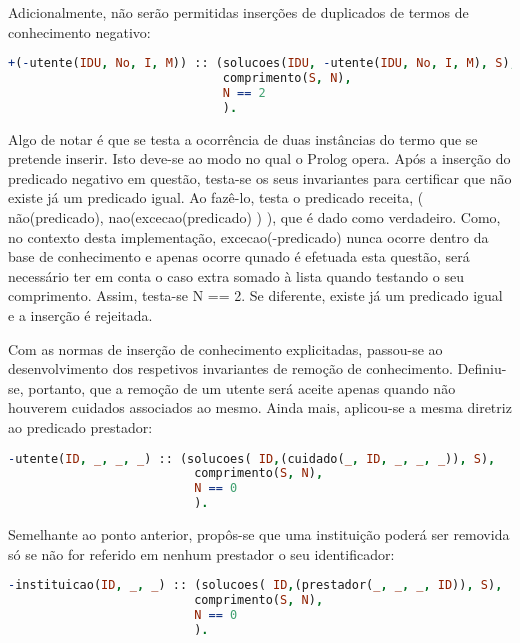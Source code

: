 \documentclass[a4paper]{article}
\begin{document}
\par Adicionalmente, não serão permitidas inserções de duplicados de termos de conhecimento negativo:


\begin{lstlisting}[language=Prolog, caption=Invariante estrutural : nao permitir a insercao de duplicados de conhecimento negativo relativo a utentes.]
+(-utente(IDU, No, I, M)) :: (solucoes(IDU, -utente(IDU, No, I, M), S),
                              comprimento(S, N),
                              N == 2
                              ).
\end{lstlisting}

\par Algo de notar é que se testa a ocorrência de duas instâncias do termo que se pretende inserir. Isto deve-se ao modo no qual o Prolog opera. Após a inserção do predicado negativo em questão, testa-se os seus invariantes para certificar que não existe já um predicado igual. Ao fazê-lo, testa o predicado receita, ( não(predicado), nao(excecao(predicado)  ) ), que é dado como verdadeiro. Como, no contexto desta implementação, excecao(-predicado) nunca ocorre dentro da base de conhecimento e apenas ocorre qunado é efetuada esta questão, será necessário ter em conta o caso extra somado à lista quando testando o seu comprimento. Assim, testa-se N == 2. Se diferente, existe já um predicado igual e a inserção é rejeitada.

\par Com as normas de inserção de conhecimento explicitadas, passou-se ao desenvolvimento dos respetivos invariantes de remoção de conhecimento. Definiu-se, portanto, que a remoção de um utente será aceite apenas quando não houverem cuidados associados ao mesmo. Ainda mais, aplicou-se a mesma diretriz ao predicado prestador:

\begin{lstlisting}[language=Prolog, caption=Invariante referencial : não permitir a remoção de utentes com cuidados registados.]
-utente(ID, _, _, _) :: (solucoes( ID,(cuidado(_, ID, _, _, _)), S),
                          comprimento(S, N),
                          N == 0
                          ).
\end{lstlisting}

\par Semelhante ao ponto anterior, propôs-se que uma instituição poderá ser removida só se não for referido em nenhum prestador o seu identificador:

\begin{lstlisting}[language=Prolog, caption=Invariante referencial : não permitir a remoção de instituições com prestadores dessa mesma instituição.]
-instituicao(ID, _, _) :: (solucoes( ID,(prestador(_, _, _, ID)), S),
                          comprimento(S, N),
                          N == 0
                          ).
\end{lstlisting}
\end{document}

